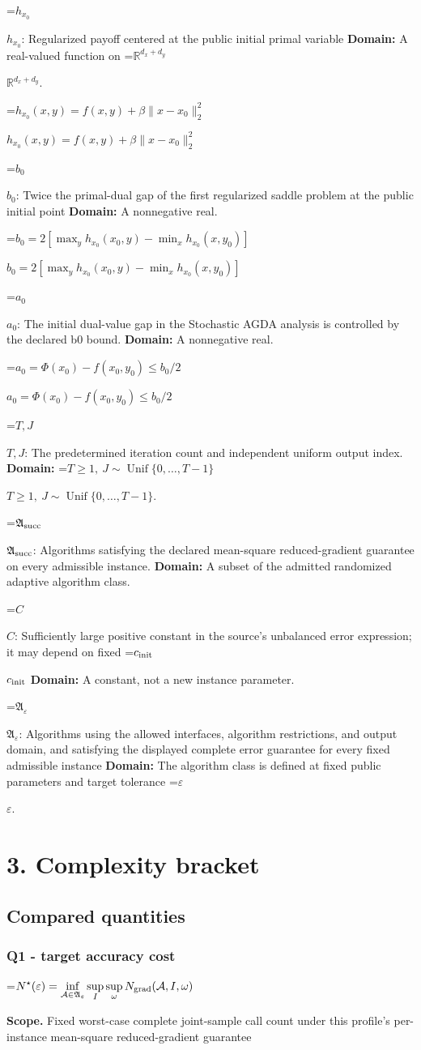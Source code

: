 \documentclass[10pt,a4paper]{article}
\newcommand{\AtlasMath}[1]{\par\begingroup\centering\setbox0=\hbox{$\displaystyle #1$}\ifdim\wd0>1.4\linewidth\typeout{ATLAS WIDE FORMULA: \the\wd0}\fi\ifdim\wd0>\linewidth\resizebox{\linewidth}{!}{\box0}\else\box0\fi\par\endgroup}
\newcommand{\AtlasInlineMath}[1]{\begingroup\setbox0=\hbox{$#1$}\ifdim\wd0>.4\linewidth\endgroup\AtlasMath{#1}\else\endgroup$#1$\fi}
\begin{document}
\AtlasInlineMath{h_{x_0}}: Regularized payoff centered at the public initial primal variable \textbf{Domain:} A real-valued function on \AtlasInlineMath{\mathbb R^{d_x+d_y}}.

\AtlasInlineMath{h_{x_0}(x,y)=f(x,y)+\beta\|x-x_0\|_2^2}

\AtlasInlineMath{b_0}: Twice the primal-dual gap of the first regularized saddle problem at the public initial point \textbf{Domain:} A nonnegative real.

\AtlasInlineMath{b_0=2[\max_y h_{x_0}(x_0,y)-\min_x h_{x_0}(x,y_0)]}

\AtlasInlineMath{a_0}: The initial dual-value gap in the Stochastic AGDA analysis is controlled by the declared b0 bound. \textbf{Domain:} A nonnegative real.

\AtlasInlineMath{a_0=\Phi(x_0)-f(x_0,y_0)\le b_0/2}

\AtlasInlineMath{T,J}: The predetermined iteration count and independent uniform output index. \textbf{Domain:} \AtlasInlineMath{T\ge1,\ J\sim\operatorname{Unif}\{0,\ldots,T-1\}}.

\AtlasInlineMath{\mathfrak A_{\rm succ}}: Algorithms satisfying the declared mean-square reduced-gradient guarantee on every admissible instance. \textbf{Domain:} A subset of the admitted randomized adaptive algorithm class.

\AtlasInlineMath{C}: Sufficiently large positive constant in the source's unbalanced error expression; it may depend on fixed \AtlasInlineMath{c_{\rm init}} \textbf{Domain:} A constant, not a new instance parameter.

\AtlasInlineMath{\mathfrak A_\varepsilon}: Algorithms using the allowed interfaces, algorithm restrictions, and output domain, and satisfying the displayed complete error guarantee for every fixed admissible instance \textbf{Domain:} The algorithm class is defined at fixed public parameters and target tolerance \AtlasInlineMath{\varepsilon}.

\section{3. Complexity bracket}
\subsection{Compared quantities}
\subsubsection{Q1 - target accuracy cost}
\AtlasMath{N^\star(\varepsilon)=\inf_{\mathcal A\in\mathfrak A_\varepsilon}\sup_I \sup_\omega N_{\rm grad}(\mathcal A,I,\omega)}
\textbf{Scope.} Fixed worst-case complete joint-sample call count under this profile's per-instance mean-square reduced-gradient guarantee
\end{document}
